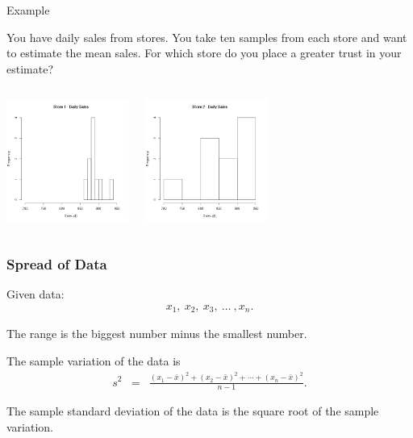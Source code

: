 \begin{frame}{Example}

  You have daily sales from stores. You take ten samples from each store and
  want to estimate the mean sales. For which store do you place a
  greater trust in your estimate?

  \begin{columns}
    \includegraphics[width=4cm]{img/dailySalesStore1}

    \includegraphics[width=4cm]{img/dailySalesStore2}
    
  \end{columns}
  
\end{frame}

\begin{frame}
  \frametitle{Spread of Data}

  Given data:
  \begin{eqnarray*}
    x_1, ~ x_2, ~ x_3, ~ \ldots ~,x_n.
  \end{eqnarray*}

  \begin{definition}
    The range is the biggest number minus the smallest number.
  \end{definition}


  \begin{definition}
    The sample variation of the data is 
    \begin{eqnarray*}
      s^2 & = & \frac{(x_1-\bar{x})^2+(x_2-\bar{x})^2+\cdots+(x_n-\bar{x})^2}{n-1}.
    \end{eqnarray*}
  \end{definition}

  \begin{definition}
    The sample standard deviation of the data is the square root of
    the sample variation.
  \end{definition}


\end{frame}

